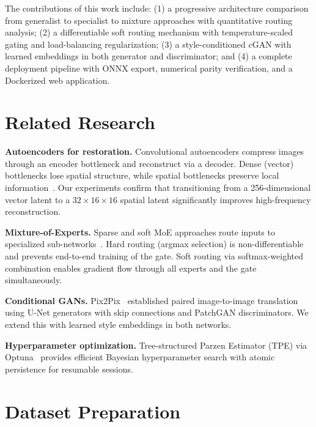 \documentclass[conference]{IEEEtran}
\begin{document}
The contributions of this work include: (1) a progressive architecture comparison from generalist to specialist to mixture approaches with quantitative routing analysis; (2) a differentiable soft routing mechanism with temperature-scaled gating and load-balancing regularization; (3) a style-conditioned cGAN with learned embeddings in both generator and discriminator; and (4) a complete deployment pipeline with ONNX export, numerical parity verification, and a Dockerized web application.

\section{Related Research}

\textbf{Autoencoders for restoration.} Convolutional autoencoders compress images through an encoder bottleneck and reconstruct via a decoder. Dense (vector) bottlenecks lose spatial structure, while spatial bottlenecks preserve local information~\cite{parkhi2012pets}. Our experiments confirm that transitioning from a 256-dimensional vector latent to a $32 \times 16 \times 16$ spatial latent significantly improves high-frequency reconstruction.

\textbf{Mixture-of-Experts.} Sparse and soft MoE approaches route inputs to specialized sub-networks~\cite{shazeer2017moe}. Hard routing (argmax selection) is non-differentiable and prevents end-to-end training of the gate. Soft routing via softmax-weighted combination enables gradient flow through all experts and the gate simultaneously.

\textbf{Conditional GANs.} Pix2Pix~\cite{isola2017pix2pix} established paired image-to-image translation using U-Net generators with skip connections and PatchGAN discriminators. We extend this with learned style embeddings in both networks.

\textbf{Hyperparameter optimization.} Tree-structured Parzen Estimator (TPE) via Optuna~\cite{akiba2019optuna} provides efficient Bayesian hyperparameter search with atomic persistence for resumable sessions.

\section{Dataset Preparation}
\end{document}
